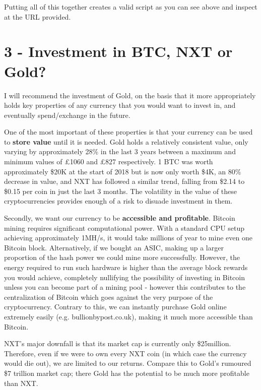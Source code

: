 \documentclass[11pt]{article}
\begin{document}
	Putting all of this together creates a valid script as you can see above and inspect at the URL provided.
	
	\newpage
	
	
	\section*{3 - Investment in BTC, NXT or Gold?}
	I will recommend the investment of Gold, on the basis that it more appropriately holds key properties of any currency that you would want to invest in, and eventually spend/exchange in the future. \newline
	
	One of the most important of these properties is that your currency can be used to \textbf{store value} until it is needed. Gold holds a relatively consistent value, only varying by approximately 28\% in the last 3 years between a maximum and minimum values of \pounds 1060 and \pounds 827 respectively. 1 BTC was worth approximately \$20K at the start of 2018 but is now only worth \$4K, an 80\% decrease in value, and NXT has followed a similar trend, falling from \$2.14 to \$0.15 per coin in just the last 3 months. The volatility in the value of these cryptocurrencies provides enough of a risk to disuade investment in them. \newline
	
	Secondly, we want our currency to be \textbf{accessible and profitable}. Bitcoin mining requires significant computational power. With a standard CPU setup achieving approximately 1MH/s, it would take millions of year to mine even one Bitcoin block. Alternatively, if we bought an ASIC, making up a larger proportion of the hash power we could mine more successfully. However, the energy required to run such hardware is higher than the average block rewards you would achieve, completely nullifying the possibility of investing in Bitcoin unless you can become part of a mining pool - however this contributes to the centralization of Bitcoin which goes against the very purpose of the cryptocurrency. Contrary to this, we can instantly purchase Gold online extremely easily (e.g. bullionbypost.co.uk), making it much more accessible than Bitcoin. 
	
	NXT's major downfall is that its market cap is currently only \$25million. Therefore, even if we were to own every NXT coin (in which case the currency would die out), we are limited to our returns. Compare this to Gold's rumoured \$7 trillion market cap; there Gold has the potential to be much more profitable than NXT. \newline
	
\end{document}
